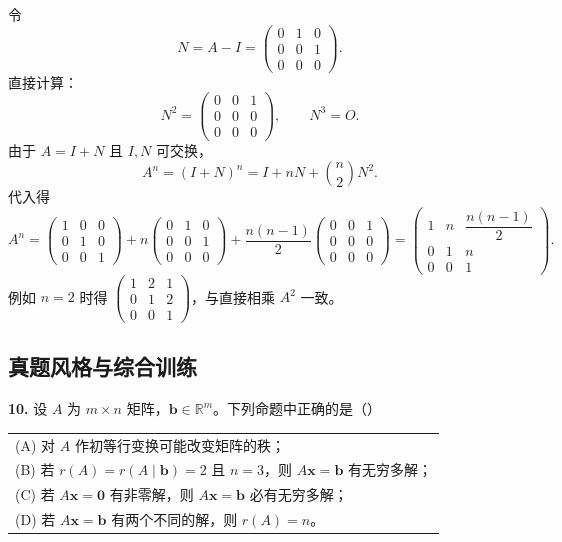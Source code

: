 令
\[
N=A-I=\begin{pmatrix}0&1&0\\0&0&1\\0&0&0\end{pmatrix}.
\]
直接计算：
\[
N^2=\begin{pmatrix}0&0&1\\0&0&0\\0&0&0\end{pmatrix},\qquad
N^3=O.
\]
由于 \(A=I+N\) 且 \(I,N\) 可交换，
\[
A^n=(I+N)^n=I+nN+\binom n2N^2.
\]
代入得
\[
A^n=\begin{pmatrix}1&0&0\\0&1&0\\0&0&1\end{pmatrix}
+n\begin{pmatrix}0&1&0\\0&0&1\\0&0&0\end{pmatrix}
+\frac{n(n-1)}2\begin{pmatrix}0&0&1\\0&0&0\\0&0&0\end{pmatrix}
=\begin{pmatrix}1&n&\dfrac{n(n-1)}2\\0&1&n\\0&0&1\end{pmatrix}.
\]
例如 \(n=2\) 时得 \(\begin{pmatrix}1&2&1\\0&1&2\\0&0&1\end{pmatrix}\)，与直接相乘 \(A^2\) 一致。

\else \answerarea[8] \fi%

\subsection{真题风格与综合训练}

\textbf{10.} 设 \(A\) 为 \(m\times n\) 矩阵，\(\boldsymbol b\in\mathbb R^m\)。下列命题中正确的是（\quad）
\begin{center}
\begin{tabular}{l}
(A) 对 \(A\) 作初等行变换可能改变矩阵的秩；\\[3pt]
(B) 若 \(r(A)=r(A\mid\boldsymbol b)=2\) 且 \(n=3\)，则 \(A\boldsymbol x=\boldsymbol b\) 有无穷多解；\\[3pt]
(C) 若 \(A\boldsymbol x=\boldsymbol 0\) 有非零解，则 \(A\boldsymbol x=\boldsymbol b\) 必有无穷多解；\\[3pt]
(D) 若 \(A\boldsymbol x=\boldsymbol b\) 有两个不同的解，则 \(r(A)=n\)。
\end{tabular}
\end{center}

